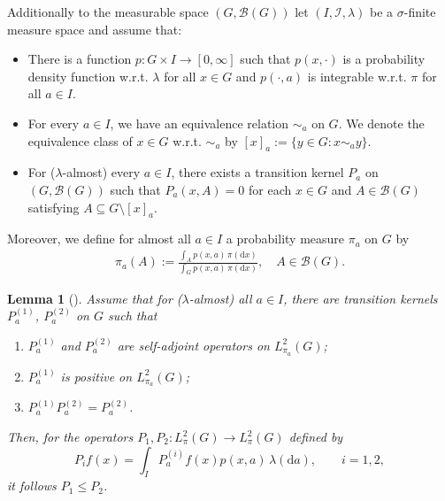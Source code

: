 \documentclass[sn-mathphys-num]{sn-jnl}%
\theoremstyle{thmstyleone}%
\newtheorem{lemma}[theorem]{Lemma}
\theoremstyle{thmstyletwo}%
\theoremstyle{thmstylethree}%
\begin{document}
\begin{appendices}
Additionally to the measurable space $(G,\mathcal{B}(G))$ let $(I,\mathcal{I},\lambda)$ be a $\sigma$-finite measure space and assume that: 
\begin{itemize}
	\item[{(a)}] 
	There is a function $p\colon G\times I\rightarrow [0,\infty]$ such that $p(x,\cdot)$ is a probability density function w.r.t. $\lambda$ for all $x\in G$ and $p(\cdot,a)$ is integrable w.r.t. $\pi$ for all $a\in I$.
	\item[{(b)}]  
	For every $a\in I$, we have an equivalence relation $\sim_a$ on $G$. We denote the equivalence class of $x\in G$ w.r.t. $\sim_a$ by $[x]_a:=\{y\in G: x \sim_a y\}$.
	\item[{(c)}] 
	For ($\lambda$-almost) every $a\in I$, there exists a transition kernel $P_a$ on $(G, \mathcal{B}(G))$ such that $P_a(x,A)=0$ for each $x\in G$ and $A\in \mathcal{B}(G)$ satisfying $A \subseteq G\setminus [x]_a$. 
\end{itemize}
Moreover, we define for almost all $a\in I$ a probability measure $\pi_{{a}}$ on $G$ by
\begin{align*}
	\pi_a(A):=\frac{\int_{A}p(x,a) \,\pi(\mathrm{d}x)}{\int_{{G}}p(x,a) \,\pi(\mathrm{d}x)}, \quad A\in\mathcal{B}(G).
\end{align*} 

\begin{lemma}[\citet{RudolfUllrich2018}]\label{PMLR:lemma:comparison}
	Assume that for ($\lambda$-almost) all $a\in I$, there are transition kernels $P^{(1)}_a$, $P^{(2)}_a$ on $G$ such that
	\begin{enumerate}
		\item $P^{(1)}_a$ and $P^{(2)}_a$ are self-adjoint operators on $L^2_{\pi_{a}}(G)$;
		\label{en1}
		\item $P^{(1)}_a$ is positive on $L^2_{\pi_{a}}(G)$;
		\item $P^{(1)}_aP^{(2)}_a=P^{(2)}_a$. 
		\label{en3}
	\end{enumerate}
	Then, for the operators $P_1, P_2\colon L^2_{\pi}(G) \rightarrow L^2_{\pi}(G)$ defined by
	\begin{equation*}
		P_if(x)=\int_{I} P^{(i)}_a f(x) p(x,a) \,\lambda(\mathrm{d}a), \qquad i=1,2,
	\end{equation*}
	it follows $P_1\leq P_2$.  
\end{lemma}


\end{appendices}
\end{document}

